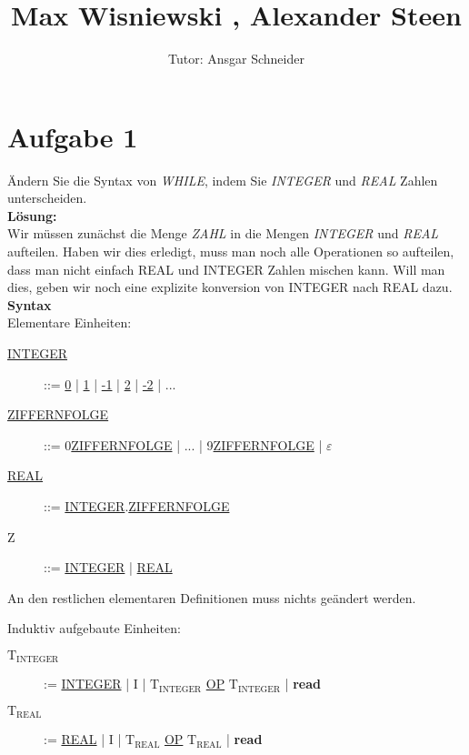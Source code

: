 \documentclass[11pt,a4paper,ngerman]{article}
\author{Tutor: Ansgar Schneider}
\date{}
\title{Max Wisniewski , Alexander Steen}
\begin{document}

\maketitle
\thispagestyle{fancy}



\section*{Aufgabe 1}

Ändern Sie die Syntax von \emph{WHILE}, indem Sie \emph{INTEGER} und \emph{REAL} Zahlen unterscheiden.\\

\textbf{Lösung:}\\
Wir müssen zunächst die Menge \emph{ZAHL} in die Mengen \emph{INTEGER} und \emph{REAL} aufteilen. Haben wir dies erledigt, muss man noch alle Operationen so aufteilen, dass man nicht einfach REAL und INTEGER Zahlen mischen kann. Will man dies, geben wir noch eine explizite konversion von INTEGER nach REAL dazu.\\

\textbf{Syntax}\\
Elementare Einheiten:
\begin{description}
	\item[\mdseries \underline{INTEGER}] ::= \underline{0} | \underline{1}
		| 	\underline{-1} | \underline{2} | \underline{-2} | ...
	\item[\mdseries\underline{ZIFFERNFOLGE}] ::=  0\underline{ZIFFERNFOLGE}
		| ... | 9\underline{ZIFFERNFOLGE} | $\varepsilon$
	\item[\mdseries\underline{REAL}] ::= 
		\underline{INTEGER}.\underline{ZIFFERNFOLGE}
	\item[\mdseries Z] ::= \underline{INTEGER} | \underline{REAL}
\end{description}
An den restlichen elementaren Definitionen muss nichts geändert werden.

Induktiv aufgebaute Einheiten:
\begin{description}
	\item[\mdseries \underline{$\text{T}_{\text{INTEGER}}$}] := \underline{INTEGER} | I
		| \underline{$\text{T}_{\text{INTEGER}}$} \underline{OP} \underline{$\text{T}_{\text{INTEGER}}$}
		| \textbf{read}
	\item[\mdseries \underline{$\text{T}_{\text{REAL}}$}] := \underline{REAL} | I
		| \underline{$\text{T}_{\text{REAL}}$} \underline{OP} \underline{$\text{T}_{\text{REAL}}$}
		| \textbf{read}
\end{description}
\label{LastPage}
\end{document}
